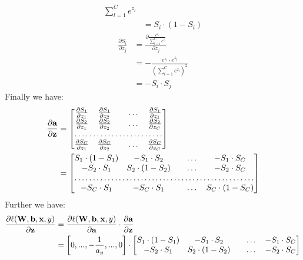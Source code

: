 \documentclass[10pt,a4paper]{article}
\begin{document}
\begin{enumerate}
\begin{align}
{\sum_{l=1}^{C}e^{z_{l}}}\\
&= S_i \cdot (1 - S_i)
\end{align}
\begin{align}
\frac{\partial S_i}{\partial z_j} &= 
\frac{\partial \frac{ e^{z_{i}}}{\sum_{l=1}^{C}e^{z_{l}}}}{\partial z_j}\\
&=-\frac{e^{z_{i}}\cdot e^{z_{j}}}{\left(\sum_{l=1}^{C}e^{z_{l}}\right)^2}\\
&= -S_i \cdot S_j
\end{align}
Finally  we have:
\begin{align}
\frac{\partial \vect{a}}{\partial \vect{z}}  &=
\begin{bmatrix}
    \frac{\partial S_1}{\partial z_1}     & 
    \frac{\partial S_1}{\partial z_2}      &  & \dots & \frac{\partial S_1}{\partial z_1}  \\
    \frac{\partial S_2}{\partial z_1}     & 
    \frac{\partial S_2}{\partial z_2}      &  & \dots & \frac{\partial S_2}{\partial z_C}\\
    \hdotsfor{5} \\
    \frac{\partial S_C}{\partial z_1}     & 
    \frac{\partial S_C}{\partial z_2}      &  & \dots & \frac{\partial S_C}{\partial z_C}\\
\end{bmatrix} \nonumber \\
&=
\begin{bmatrix}
    S_1 \cdot (1- S_1)    & 
-S_1 \cdot S_2      &  & \dots & -S_1\cdot S_C \\
- S_2 \cdot S_1    & 
S_2 \cdot (1 - S_2)      &  & \dots & -S_2 \cdot S_C \\
    \hdotsfor{5} \\
        -S_C \cdot S_1    & 
-S_C \cdot S_1      &  & \dots & S_C \cdot (1 - S_C) \\
\end{bmatrix}
\end{align}
Further we have:
\begin{align}
\frac{\partial \ell(\textbf{\text{{W}}}, \textbf{\text{{b}}}, \textbf{\text{{x}}}, y)}{\partial \textbf{\text{{z}}}} &=
\frac{\partial \ell (\textbf{\text{{W}}}, \textbf{\text{{b}}}, \textbf{\text{{x}}}, y)}{\partial \textbf{\text{{a}}}}
\cdot \frac{\partial \textbf{\text{{a}}}}{\partial \textbf{\text{{z}}}}\\
&= \left[0, ..., -\frac{1}{a_y}, ..., 0\right] \cdot 
\begin{bmatrix}
    S_1 \cdot (1- S_1)    & 
-S_1 \cdot S_2      &  & \dots & -S_1\cdot S_C \\
- S_2 \cdot S_1    & 
S_2 \cdot (1 - S_2)      &  & \dots & -S_2 \cdot S_C \\

\end{bmatrix}
\end{align}
\end{enumerate}
\end{document}
